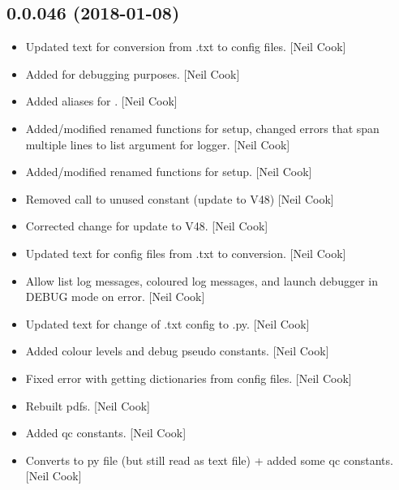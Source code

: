 \documentclass[a4paper,10pt,english]{report}
\begin{document}
\subsection{0.0.046 (2018-01-08)}
\label{\detokenize{misc/changelog:id506}}\begin{itemize}
\item {} 
Updated text for conversion from .txt to  config files. {[}Neil Cook{]}

\item {} 
Added  for debugging purposes. {[}Neil Cook{]}

\item {} 
Added aliases for . {[}Neil Cook{]}

\item {} 
Added/modified renamed functions for setup, changed errors that span
multiple lines to list argument for logger. {[}Neil Cook{]}

\item {} 
Added/modified renamed functions for setup. {[}Neil Cook{]}

\item {} 
Removed call to unused constant (update to V48) {[}Neil Cook{]}

\item {} 
Corrected change for update to V48. {[}Neil Cook{]}

\item {} 
Updated text for config files from .txt to  conversion. {[}Neil Cook{]}

\item {} 
Allow list log messages, coloured log messages, and launch debugger in
DEBUG mode on error. {[}Neil Cook{]}

\item {} 
Updated text for change of .txt config to .py. {[}Neil Cook{]}

\item {} 
Added colour levels and debug pseudo constants. {[}Neil Cook{]}

\item {} 
Fixed error with getting dictionaries from config files. {[}Neil Cook{]}

\item {} 
Rebuilt pdfs. {[}Neil Cook{]}

\item {} 
Added qc constants. {[}Neil Cook{]}

\item {} 
Converts to py file (but still read as text file) + added some qc
constants. {[}Neil Cook{]}


\end{itemize}
\end{document}
